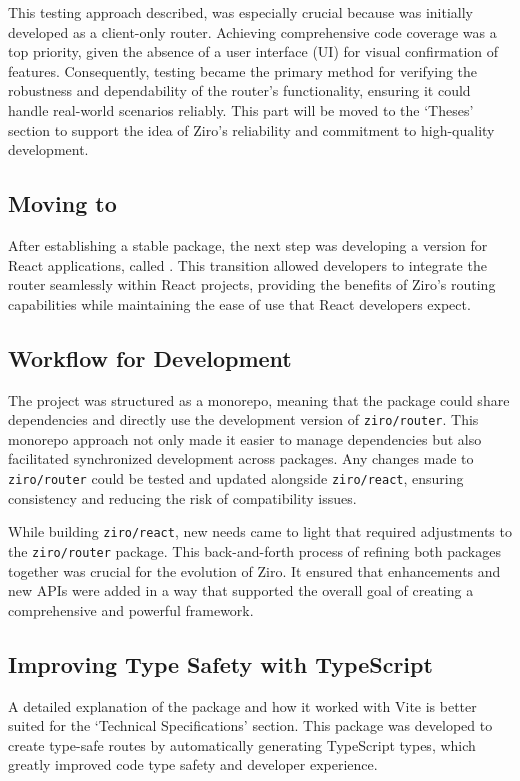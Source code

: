 This testing approach described, was especially crucial because  was initially developed as a client-only router. Achieving comprehensive code coverage was a top priority, given the absence of a user interface (UI) for visual confirmation of features. Consequently, testing became the primary method for verifying the robustness and dependability of the router’s functionality, ensuring it could handle real-world scenarios reliably. This part will be moved to the ‘Theses’ section to support the idea of Ziro’s reliability and commitment to high-quality development.

\subsection{Moving to }
After establishing a stable  package, the next step was developing a version for React applications, called . This transition allowed developers to integrate the router seamlessly within React projects, providing the benefits of Ziro’s routing capabilities while maintaining the ease of use that React developers expect.

\subsection{Workflow for Development}
The project was structured as a monorepo, meaning that the  package could share dependencies and directly use the development version of \texttt{ziro/router}. This monorepo approach not only made it easier to manage dependencies but also facilitated synchronized development across packages. Any changes made to \texttt{ziro/router} could be tested and updated alongside \texttt{ziro/react}, ensuring consistency and reducing the risk of compatibility issues.

While building \texttt{ziro/react}, new needs came to light that required adjustments to the \texttt{ziro/router} package. This back-and-forth process of refining both packages together was crucial for the evolution of Ziro. It ensured that enhancements and new APIs were added in a way that supported the overall goal of creating a comprehensive and powerful framework.


\subsection{Improving Type Safety with TypeScript}
A detailed explanation of the  package and how it worked with Vite is better suited for the ‘Technical Specifications’ section. This package was developed to create type-safe routes by automatically generating TypeScript types, which greatly improved code type safety and developer experience.

